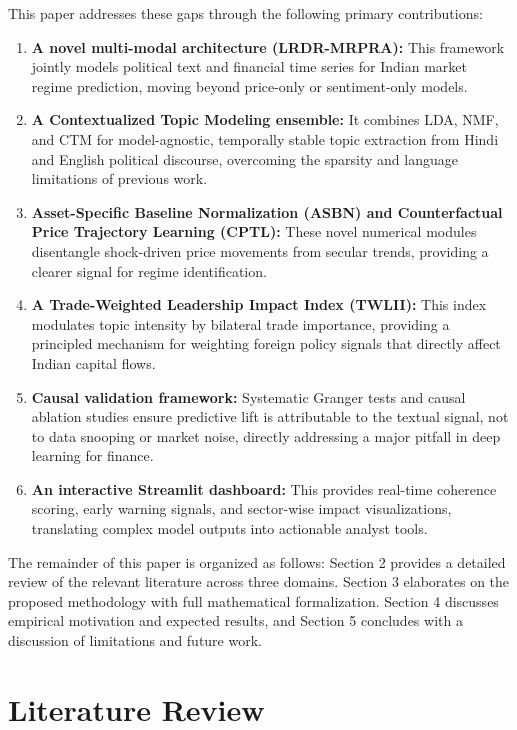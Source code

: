 \documentclass[11pt]{article}
\begin{document}
This paper addresses these gaps through the following primary contributions:
\begin{enumerate}[leftmargin=*, itemsep=0pt, topsep=4pt]
    \item \textbf{A novel multi-modal architecture (LRDR-MRPRA):} This framework jointly models political text and financial time series for Indian market regime prediction, moving beyond price-only or sentiment-only models.
    \item \textbf{A Contextualized Topic Modeling ensemble:} It combines LDA, NMF, and CTM for model-agnostic, temporally stable topic extraction from Hindi and English political discourse, overcoming the sparsity and language limitations of previous work.
    \item \textbf{Asset-Specific Baseline Normalization (ASBN) and Counterfactual Price Trajectory Learning (CPTL):} These novel numerical modules disentangle shock-driven price movements from secular trends, providing a clearer signal for regime identification.
    \item \textbf{A Trade-Weighted Leadership Impact Index (TWLII):} This index modulates topic intensity by bilateral trade importance, providing a principled mechanism for weighting foreign policy signals that directly affect Indian capital flows.
    \item \textbf{Causal validation framework:} Systematic Granger tests and causal ablation studies ensure predictive lift is attributable to the textual signal, not to data snooping or market noise, directly addressing a major pitfall in deep learning for finance.
    \item \textbf{An interactive Streamlit dashboard:} This provides real-time coherence scoring, early warning signals, and sector-wise impact visualizations, translating complex model outputs into actionable analyst tools.
\end{enumerate}

The remainder of this paper is organized as follows: Section 2 provides a detailed review of the relevant literature across three domains. Section 3 elaborates on the proposed methodology with full mathematical formalization. Section 4 discusses empirical motivation and expected results, and Section 5 concludes with a discussion of limitations and future work.

\section{Literature Review}
\label{sec:litreview}
\end{document}

